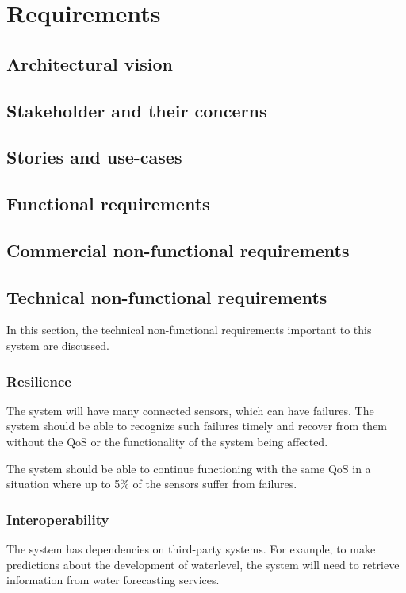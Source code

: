 \chapter{Requirements}
\label{ch:requirements}

\section{Architectural vision}
\section{Stakeholder and their concerns}
\section{Stories and use-cases}
\section{Functional requirements}
\section{Commercial non-functional requirements}

\section{Technical non-functional requirements}
In this section, the technical non-functional requirements important to this system are discussed.

\subsection{Resilience}
The system will have many connected sensors, which can have failures. The system should be able to recognize such failures timely and recover from them without the QoS or the functionality of the system being affected. 

The system should be able to continue functioning with the same QoS in a situation where up to 5\% of the sensors suffer from failures.  %

\subsection{Interoperability}
The system has dependencies on third-party systems. For example, to make predictions about the development of waterlevel, the system will need to retrieve information from water forecasting services. 

